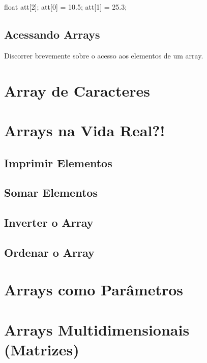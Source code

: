 \begin{ccode}
  float att[2];
  att[0] = 10.5;
  att[1] = 25.3;
\end{ccode}

\subsection{Acessando Arrays}
Discorrer brevemente sobre o acesso aos elementos de um array.

\section{Array de Caracteres}

\section{Arrays na Vida Real?!}
\subsection{Imprimir Elementos}
\subsection{Somar Elementos}
\subsection{Inverter o Array}
\subsection{Ordenar o Array}

\section{Arrays como Parâmetros}

\section{Arrays Multidimensionais (Matrizes)}


